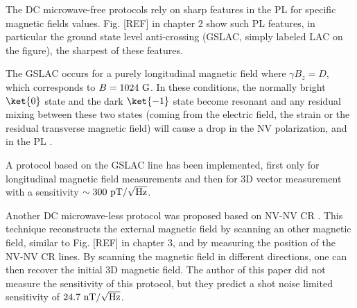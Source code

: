 \documentclass[a4paper,11pt]{report}
\begin{document}

The DC microwave-free protocols rely on sharp features in the PL for specific magnetic fields values. Fig. [REF] in chapter 2 show such PL features, in particular the ground state level anti-crossing (GSLAC, simply labeled LAC on the figure), the sharpest of these features.

The GSLAC occurs for a purely longitudinal magnetic field where $\gamma B_z = D$, which corresponds to $B=1024\ \rm G$. In these conditions, the normally bright $\ket{0}$ state and the dark $\ket{-1}$ state become resonant and any residual mixing between these two states (coming from the electric field, the strain or the residual transverse magnetic field) will cause a drop in the NV polarization, and in the PL \citep{broadway2016anticrossing}. 

A protocol based on the GSLAC line has been implemented, first only for longitudinal magnetic field measurements \citep{wickenbrock2016microwave} and then for 3D vector measurement \citep{zheng2020microwave} with a sensitivity $\sim 300\ \rm pT/\sqrt{\rm Hz}$.

Another DC microwave-less protocol was proposed based on NV-NV CR \citep{akhmedzhanov2017microwave, akhmedzhanov2019magnetometry}. This technique reconstructs the external magnetic field by scanning an other magnetic field, similar to Fig. [REF] in chapter 3, and by measuring the position of the NV-NV CR lines. By scanning the magnetic field in different directions, one can then recover the initial 3D magnetic field. The author of this paper did not measure the sensitivity of this protocol, but they predict a shot noise limited sensitivity of $24.7\ \rm nT/\sqrt{\rm Hz}$.

%
\end{document}

